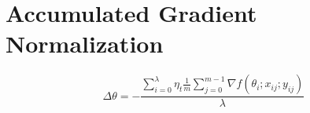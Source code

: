 %
%
%

\chapter{Accumulated Gradient Normalization}
\label{chapter:accumulated_gradient_normalization}

\begin{equation}
  \label{eq:accumulated_gradient_normalization}
  \Delta\theta = -\frac{\sum_{i = 0}^\lambda \eta_t \frac{1}{m}\sum_{j = 0}^{m - 1} \nabla f(\theta_i;x_{ij};y_{ij})}{\lambda}
\end{equation}
